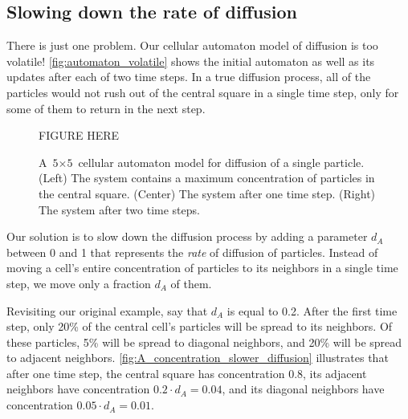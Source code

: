 \begin{note}\end{note}

\FloatBarrier
{}
\subsection{Slowing down the rate of diffusion}

There is just one problem. Our cellular automaton model of diffusion is too volatile! \autoref{fig:automaton_volatile} shows the initial automaton as well as its updates after each of two time steps. In a true diffusion process, all of the particles would not rush out of the central square in a single time step, only for some of them to return in the next step.\\

\begin{figure}[h]
\centering
\mySfFamily
FIGURE HERE
\caption{A $\text{5} \times \text{5}$ cellular automaton model for diffusion of a single particle. (Left) The system contains a maximum concentration of particles in the central square. (Center) The system after one time step. (Right) The system after two time steps.}
\label{fig:automaton_volatile}
\end{figure}

Our solution is to slow down the diffusion process by adding a parameter $d_A$ between 0 and 1 that represents the \textit{rate} of diffusion of  particles. Instead of moving a cell's entire concentration of particles to its neighbors in a single time step, we move only a fraction $d_A$ of them.

Revisiting our original example, say that $d_A$ is equal to 0.2. After the first time step, only 20\% of the central cell's particles will be spread to its neighbors. Of these particles, 5\% will be spread to diagonal neighbors, and 20\% will be spread to adjacent neighbors. \autoref{fig:A_concentration_slower_diffusion} illustrates that after one time step, the central square has concentration 0.8, its adjacent neighbors have concentration $0.2 \cdot d_A = 0.04$, and its diagonal neighbors have concentration $0.05 \cdot d_A = 0.01$.\\


